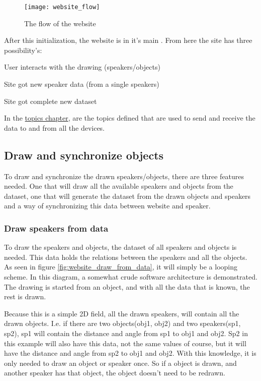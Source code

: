 \begin{figure}[H]
    \centering
    \texttt{[image: website\_flow]}
    \caption{The flow of the website}
    \label{fig:website_flow}
\end{figure}

After this initialization, the website is in it's main . From here the site has three possibility's:
\begin{shortlist}
    \item User interacts with the drawing (speakers/objects)
    \item Site got new speaker data (from a single speakers)
    \item Site got complete new dataset
\end{shortlist}
In the \hyperref[chap:Topics]{topics chapter}, are the topics defined that are used to send and receive the data to and from all the devices.

\subsection{Draw and synchronize objects}
To draw and synchronize the drawn speakers/objects, there are three features needed.
One that will draw all the available speakers and objects from the dataset,
one that will generate the dataset from the drawn objects and speakers
and a way of synchronizing this data between website and speaker.

\subsubsection{Draw speakers from data}
To draw the speakers and objects, the dataset of all speakers and objects is needed.
This data holds the relations between the speakers and all the objects.
As seen in figure \ref{fig:website_draw_from_data}, it will simply be a looping scheme.
In this diagram, a somewhat crude software architecture is demonstrated.
The drawing is started from an object, and with all the data that is known, the rest is drawn.

Because this is a simple 2D field, all the drawn speakers, will contain all the drawn objects.
I.e. if there are two objects(obj1, obj2) and two speakers(sp1, sp2), sp1 will contain the distance and angle from sp1 to obj1 and obj2.
Sp2 in this example will also have this data, not the same values of course, but it will have the distance and angle from sp2 to obj1 and obj2.
With this knowledge, it is only needed to draw an object or speaker once.
So if a object is drawn, and another speaker has that object, the object doesn't need to be redrawn.

